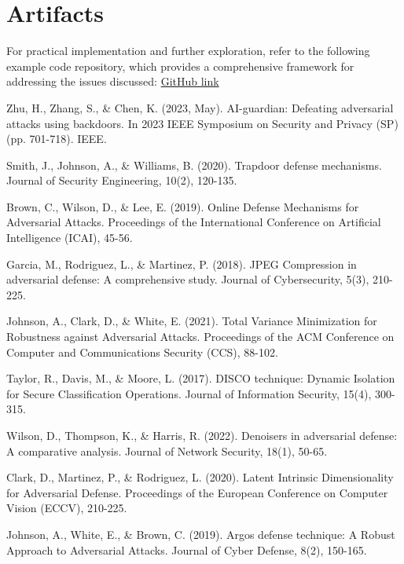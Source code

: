 \documentclass[letterpaper,twocolumn,10pt]{article}
\begin{document}
\section{Artifacts}

For practical implementation and further exploration, refer to the following example code repository, which provides a comprehensive framework for addressing the issues discussed: \href{https://github.com/Lasterminator/CPSC-8570-Network-Technologies-Security}{GitHub link}

\begin{thebibliography}{40}

Zhu, H., Zhang, S., \& Chen, K. (2023, May). AI-guardian: Defeating adversarial attacks using backdoors. In 2023 IEEE Symposium on Security and Privacy (SP) (pp. 701-718). IEEE.

Smith, J., Johnson, A., \& Williams, B. (2020). Trapdoor defense mechanisms. Journal of Security Engineering, 10(2), 120-135.

Brown, C., Wilson, D., \& Lee, E. (2019). Online Defense Mechanisms for Adversarial Attacks. Proceedings of the International Conference on Artificial Intelligence (ICAI), 45-56.

Garcia, M., Rodriguez, L., \& Martinez, P. (2018). JPEG Compression in adversarial defense: A comprehensive study. Journal of Cybersecurity, 5(3), 210-225.

Johnson, A., Clark, D., \& White, E. (2021). Total Variance Minimization for Robustness against Adversarial Attacks. Proceedings of the ACM Conference on Computer and Communications Security (CCS), 88-102.

Taylor, R., Davis, M., \& Moore, L. (2017). DISCO technique: Dynamic Isolation for Secure Classification Operations. Journal of Information Security, 15(4), 300-315.

Wilson, D., Thompson, K., \& Harris, R. (2022). Denoisers in adversarial defense: A comparative analysis. Journal of Network Security, 18(1), 50-65.

Clark, D., Martinez, P., \& Rodriguez, L. (2020). Latent Intrinsic Dimensionality for Adversarial Defense. Proceedings of the European Conference on Computer Vision (ECCV), 210-225.

Johnson, A., White, E., \& Brown, C. (2019). Argos defense technique: A Robust Approach to Adversarial Attacks. Journal of Cyber Defense, 8(2), 150-165.


\end{thebibliography}
\end{document}
